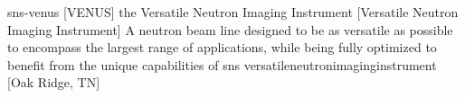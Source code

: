 \newglsXinstitution%
{sns-venus}%
[VENUS]%
{the Versatile Neutron Imaging Instrument}%
[Versatile Neutron Imaging Instrument]%
{A neutron beam line designed to be as versatile as possible to encompass the largest range of applications, while being fully optimized to benefit from the unique capabilities of \gls{sns} \cite{website:SNS:VENUS}}%
{versatileneutronimaginginstrument}%
[Oak Ridge, TN]%